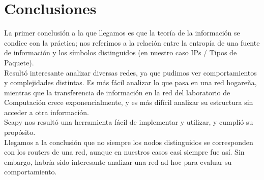 \section{Conclusiones}

La primer conclusión a la que llegamos es que la teoría de la información se condice con la práctica; nos referimos a la relación entre la entropía de una fuente de información y los símbolos distinguidos (en nuestro caso IPs / Tipos de Paquete).\\

Resultó interesante analizar diversas redes, ya que pudimos ver comportamientos y complejidades distintas. Es más fácil analizar lo que pasa en una red hogareña, mientras que la transferencia de información en la red del laboratorio de Computación crece exponencialmente, y es más difícil analizar su estructura sin acceder a otra información.\\

Scapy nos resultó una herramienta fácil de implementar y utilizar, y cumplió su propósito.\\

Llegamos a la conclusión que no siempre los nodos distinguidos se corresponden con los routers de una red, aunque en nuestros casos casi siempre fue así. Sin embargo, habría sido interesante analizar una red ad hoc para evaluar su comportamiento.\\


